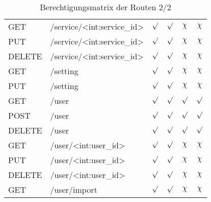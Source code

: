 \begin{table}
\begin{tabular}{l l c c c c}
		GET		& /service/<int:service\_id>		& $\surd$ & $\surd$ & $\chi$ & $\chi$ \\
		PUT		& /service/<int:service\_id>		& $\surd$ & $\surd$ & $\chi$ & $\chi$ \\
		DELETE	& /service/<int:service\_id>		& $\surd$ & $\surd$ & $\chi$ & $\chi$ \\
		GET		& /setting							& $\surd$ & $\surd$ & $\chi$ & $\chi$ \\
		PUT		& /setting							& $\surd$ & $\surd$ & $\chi$ & $\chi$ \\
		GET		& /user								& $\surd$ & $\surd$ & $\surd$ & $\surd$ \\
		POST	& /user								& $\surd$ & $\surd$ & $\surd$ & $\surd$ \\
		DELETE	& /user								& $\surd$ & $\surd$ & $\surd$ & $\surd$ \\
		GET 	& /user/<int:user\_id>				& $\surd$ & $\surd$ & $\chi$ & $\chi$ \\
		PUT 	& /user/<int:user\_id>				& $\surd$ & $\surd$ & $\chi$ & $\chi$ \\
		DELETE	& /user/<int:user\_id>				& $\surd$ & $\surd$ & $\chi$ & $\chi$ \\
		GET		& /user/import						& $\surd$ & $\surd$ & $\chi$ & $\chi$ \\
	\end{tabular}
	\caption{Berechtigungsmatrix der Routen 2/2}
	\label{table:gis-permission}
\end{table}


